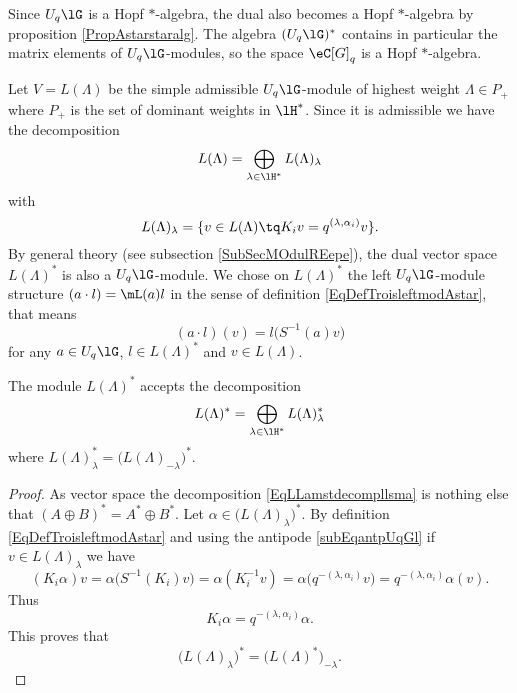 Since \( U_q\lG\) is a Hopf \( *\)-algebra, the dual also becomes a Hopf \( *\)-algebra by proposition \ref{PropAstarstaralg}. The algebra \( (U_q\lG)^*\) contains in particular the matrix elements of \( U_q\lG\)-modules, so the space \( \eC[G]_q\) is a Hopf \( *\)-algebra.

Let \( V=L(\Lambda)\) be the simple admissible \( U_q\lG\)-module of highest weight \( \Lambda\in P_+\) where \( P_+\) is the set of dominant weights in \( \lH^*\). Since it is admissible we have the decomposition
\begin{equation}
    L(\Lambda)=\bigoplus_{\lambda\in\lH^*}L(\Lambda)_{\lambda}
\end{equation}
with
\begin{equation}
    L(\Lambda)_{\lambda}=\{ v\in L(\Lambda)\tq K_iv=q^{(\lambda,\alpha_i)}v \}.
\end{equation}
By general theory (see subsection \ref{SubSecMOdulREepe}), the dual vector space \( L(\Lambda)^*\) is also a \( U_q\lG\)-module. We chose on \( L(\Lambda)^*\) the left \( U_q\lG\)-module structure \( (a\cdot l)=\mL(a)l\) in the sense of definition \eqref{EqDefTroisleftmodAstar}, that means
\begin{equation}
    (a\cdot l)(v)=l\big( S^{-1}(a)v \big)
\end{equation}
for any \( a\in U_q\lG\), \( l\in L(\Lambda)^*\) and \( v\in L(\Lambda)\).

\begin{lemma}
    The module \( L(\Lambda)^*\) accepts the decomposition
    \begin{equation}        \label{EqLLamstdecompllsma}
        L(\Lambda)^*=\bigoplus_{\lambda\in\lH^*}L(\Lambda)_{\lambda}^*
    \end{equation}
    where \( L(\Lambda)_{\lambda}^*=\big( L(\Lambda)_{-\lambda} \big)^*\).
\end{lemma}

\begin{proof}
    As vector space the decomposition \eqref{EqLLamstdecompllsma} is nothing else that \( (A\oplus B)^*=A^*\oplus B^*\). Let \( \alpha\in\big( L(\Lambda)_{\lambda} \big)^*\). By definition \eqref{EqDefTroisleftmodAstar} and using the antipode \eqref{subEqantpUqGl} if \( v\in L(\Lambda)_{\lambda}\) we have
    \begin{equation}
        (K_i\alpha)v=\alpha\big( S^{-1}(K_i)v \big)=\alpha(K_i^{-1}v) =\alpha\big( q^{-(\lambda,\alpha_i)}v \big) =q^{-(\lambda,\alpha_i)}\alpha(v).
    \end{equation}
    Thus
    \begin{equation}
        K_i\alpha=q^{-(\lambda,\alpha_i)}\alpha.
    \end{equation}
    This proves that 
    \begin{equation}
        \big( L(\Lambda)_{\lambda} \big)^*=\big( L(\Lambda)^* \big)_{-\lambda}.
    \end{equation}
\end{proof}

